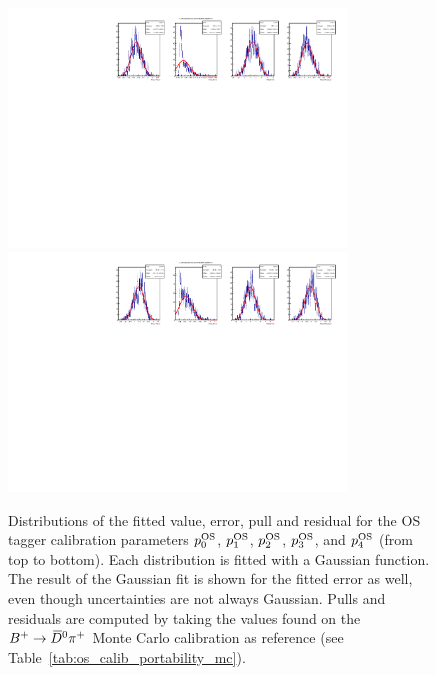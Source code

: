 \begin{figure}[t]
\begin{center}
    \includegraphics[width=0.8\textwidth]{AA-Appdx-mcbootstrap/figs/1DPullPlot_p_3_RLogisticCalibration_MCTruth_Bu2D0Pi_OS_20171114_SSbarAccAsymmFTFloatDMGammaConstrAllSamples.pdf} \\
    \includegraphics[width=0.8\textwidth]{AA-Appdx-mcbootstrap/figs/1DPullPlot_p_4_RLogisticCalibration_MCTruth_Bu2D0Pi_OS_20171114_SSbarAccAsymmFTFloatDMGammaConstrAllSamples.pdf}
    \end{center}
  \vspace{-2mm}
  \caption{Distributions of the fitted value, error, pull and residual for the OS tagger calibration parameters $p_0^{\rm OS}$, $p_1^{\rm OS}$, $p_2^{\rm OS}$, $p_3^{\rm OS}$, and $p_4^{\rm OS}$ (from top to bottom). Each distribution is fitted with a Gaussian function. The result of the Gaussian fit is shown for the fitted error as well, even though uncertainties are not always Gaussian. Pulls and residuals are computed by taking the values found on the $B^+\rightarrow \kern 0.2em\overline{\kern -0.2em D}{}^0\pi^+$ Monte Carlo calibration as reference (see Table~\ref{tab:os_calib_portability_mc}).}
  \label{fig:mc_bootstrap_os}
\end{figure}

